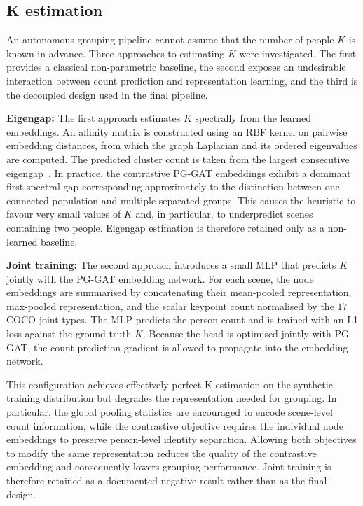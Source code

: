 \subsection{K estimation}
\label{sec_meth_kestimation}

An autonomous grouping pipeline cannot assume that the number of people
$K$ is known in advance.
Three approaches to estimating $K$ were investigated.
The first provides a classical non-parametric baseline,
the second exposes an undesirable interaction between count prediction
and representation learning,
and the third is the decoupled design used in the final pipeline.

\textbf{Eigengap:}
The first approach estimates $K$ spectrally from the learned
embeddings.
An affinity matrix is constructed using an RBF kernel on pairwise
embedding distances,
from which the graph Laplacian and its ordered eigenvalues are computed.
The predicted cluster count is taken from the largest consecutive eigengap~\cite{vonluxburg2007spectral}.
In practice,
the contrastive PG-GAT embeddings exhibit a dominant first spectral gap
corresponding approximately to the distinction between one connected
population and multiple separated groups.
This causes the heuristic to favour very small values of $K$
and, in particular, to underpredict scenes containing two people.
Eigengap estimation is therefore retained only as a non-learned baseline.

\textbf{Joint training:}
The second approach introduces a small MLP that predicts $K$ jointly
with the PG-GAT embedding network.
For each scene,
the node embeddings are summarised by concatenating their mean-pooled
representation,
max-pooled representation,
and the scalar keypoint count normalised by the $17$ COCO joint types.
The MLP predicts the person count and is trained with an L1 loss
against the ground-truth $K$.
Because the head is optimised jointly with PG-GAT,
the count-prediction gradient is allowed to propagate
into the embedding network.

This configuration achieves effectively perfect K estimation
on the synthetic training distribution
but degrades the representation needed for grouping.
In particular,
the global pooling statistics are encouraged to encode scene-level
count information,
while the contrastive objective requires the individual node embeddings
to preserve person-level identity separation.
Allowing both objectives to modify the same representation
reduces the quality of the contrastive embedding
and consequently lowers grouping performance.
Joint training is therefore retained as a documented negative result
rather than as the final design.

